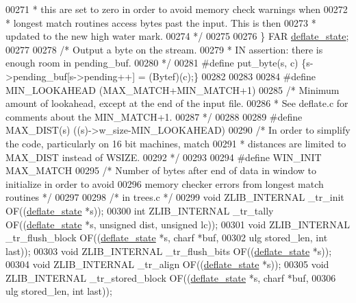 \begin{DoxyCode}
00271 \textcolor{comment}{     * this are set to zero in order to avoid memory check warnings when}
00272 \textcolor{comment}{     * longest match routines access bytes past the input.  This is then}
00273 \textcolor{comment}{     * updated to the new high water mark.}
00274 \textcolor{comment}{     */}
00275 
00276 \} FAR \hyperlink{structinternal__state}{deflate\_state};
00277 
00278 \textcolor{comment}{/* Output a byte on the stream.}
00279 \textcolor{comment}{ * IN assertion: there is enough room in pending\_buf.}
00280 \textcolor{comment}{ */}
00281 \textcolor{preprocessor}{#define put\_byte(s, c) \{s->pending\_buf[s->pending++] = (Bytef)(c);\}}
00282 
00283 
00284 \textcolor{preprocessor}{#define MIN\_LOOKAHEAD (MAX\_MATCH+MIN\_MATCH+1)}
00285 \textcolor{comment}{/* Minimum amount of lookahead, except at the end of the input file.}
00286 \textcolor{comment}{ * See deflate.c for comments about the MIN\_MATCH+1.}
00287 \textcolor{comment}{ */}
00288 
00289 \textcolor{preprocessor}{#define MAX\_DIST(s)  ((s)->w\_size-MIN\_LOOKAHEAD)}
00290 \textcolor{comment}{/* In order to simplify the code, particularly on 16 bit machines, match}
00291 \textcolor{comment}{ * distances are limited to MAX\_DIST instead of WSIZE.}
00292 \textcolor{comment}{ */}
00293 
00294 \textcolor{preprocessor}{#define WIN\_INIT MAX\_MATCH}
00295 \textcolor{comment}{/* Number of bytes after end of data in window to initialize in order to avoid}
00296 \textcolor{comment}{   memory checker errors from longest match routines */}
00297 
00298         \textcolor{comment}{/* in trees.c */}
00299 \textcolor{keywordtype}{void} ZLIB\_INTERNAL \_tr\_init OF((\hyperlink{structinternal__state}{deflate\_state} *s));
00300 \textcolor{keywordtype}{int} ZLIB\_INTERNAL \_tr\_tally OF((\hyperlink{structinternal__state}{deflate\_state} *s, \textcolor{keywordtype}{unsigned} dist, \textcolor{keywordtype}{unsigned} lc));
00301 \textcolor{keywordtype}{void} ZLIB\_INTERNAL \_tr\_flush\_block OF((\hyperlink{structinternal__state}{deflate\_state} *s, charf *buf,
00302                         ulg stored\_len, \textcolor{keywordtype}{int} last));
00303 \textcolor{keywordtype}{void} ZLIB\_INTERNAL \_tr\_flush\_bits OF((\hyperlink{structinternal__state}{deflate\_state} *s));
00304 \textcolor{keywordtype}{void} ZLIB\_INTERNAL \_tr\_align OF((\hyperlink{structinternal__state}{deflate\_state} *s));
00305 \textcolor{keywordtype}{void} ZLIB\_INTERNAL \_tr\_stored\_block OF((\hyperlink{structinternal__state}{deflate\_state} *s, charf *buf,
00306                         ulg stored\_len, \textcolor{keywordtype}{int} last));

\end{DoxyCode}
